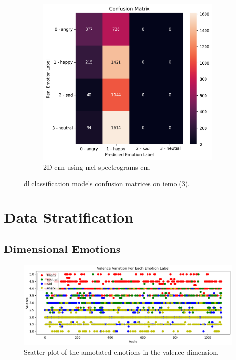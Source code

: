 \begin{figure}[H]
\begin{subfigure}{.5\textwidth}
	\end{subfigure}
	\newline
	\centering
	\begin{subfigure}{.5\textwidth}
		\centering
		\includegraphics[width=.9\linewidth]{figs/appendix/feature_selection/CNNMelSpec.png}
		\caption{2D-\ac{cnn} using mel spectrograms \ac{cm}.}
	\end{subfigure}%
	\caption{\ac{dl} classification models confusion matrices on \ac{iemo} (3).}
\end{figure}

\section{Data Stratification}

\subsection{Dimensional Emotions} \label{app:7}

\begin{figure}[H]
	\centering
	\includegraphics[width=\linewidth]{figs/appendix/IEMOCAP_data_study/valenceScatterAllEmotions.png}
	\caption{Scatter plot of the annotated emotions in the valence dimension.}
\end{figure}


